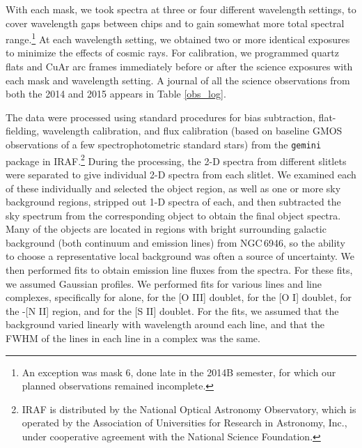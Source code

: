 
With each mask, we took spectra at three or four different wavelength settings, to cover wavelength gaps between chips and to gain somewhat more total spectral range.\footnote{An exception was mask 6, done late in the 2014B semester, for which our planned observations remained incomplete.}  At each wavelength setting, we obtained two or more identical exposures to minimize the effects of cosmic rays.
For calibration, we programmed quartz flats and CuAr arc frames  immediately before or after the science exposures with each mask and wavelength setting.  A journal of all the science observations from both the 2014 and 2015 appears in Table \ref{obs_log}.  

The data were processed using standard procedures for bias subtraction, flat-fielding, wavelength calibration, and flux calibration (based on baseline GMOS observations of a few spectrophotometric standard stars) from the {\tt gemini} package in IRAF.\footnote{IRAF is distributed by the National Optical Astronomy Observatory, which is operated by the Association of Universities for Research in Astronomy, Inc., under cooperative agreement with the National Science Foundation.}  During the processing, the 2-D spectra from different slitlets were separated to give individual 2-D spectra from each slitlet.   We examined each of these individually and selected the object region, as well as one or more sky background regions,  stripped out 1-D spectra of each, and then subtracted the sky spectrum from the corresponding object to obtain the final object spectra.
  Many of the objects are located in regions with bright surrounding galactic background (both continuum and emission lines) from NGC\,6946, so the ability to choose a representative  local background was often a source of uncertainty.  
  We then performed  fits to obtain emission line fluxes  from the spectra.  For these fits, we assumed Gaussian profiles.  We performed fits for various lines and line complexes, specifically for \hb alone, for the [O III] doublet, for the [O I] doublet, for the \ha-[N II] region, and  for the [S II] doublet. For the fits, we assumed that the background varied linearly with wavelength around each line, and that the FWHM of the lines in each line in a complex was the same.
  
